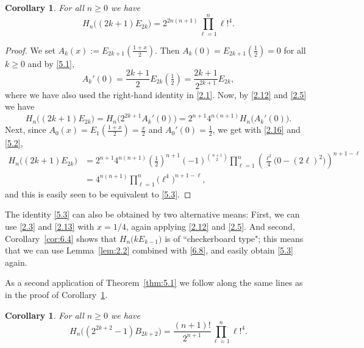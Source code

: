 \documentclass{amsart}
\theoremstyle{plain}
\newtheorem{corollary}[theorem]{Corollary}
\numberwithin{equation}{section}
\begin{document}
\begin{corollary}\label{cor:5.2}
For all $n\geq 0$ we have
\begin{equation}\label{5.3}
H_n\big((2k+1)E_{2k}\big) = 2^{2n(n+1)}\prod_{\ell=1}^n\ell!^4.
\end{equation}
\end{corollary}

\begin{proof}
We set $A_k(x):=E_{2k+1}(\frac{1+x}{2})$. Then $A_k(0)=E_{2k+1}(\frac{1}{2})=0$
for all $k\geq 0$ and by \eqref{5.1}, 
\[
A_k'(0) = \frac{2k+1}{2}E_{2k}(\tfrac{1}{2}) = \frac{2k+1}{2^{2k+1}}E_{2k},
\]
where we have also used the right-hand identity in \eqref{2.1}. 
Now, by \eqref{2.12} and \eqref{2.5} we have
\[
H_n\big((2k+1)E_{2k}\big) = H_n\big(2^{2k+1}A_k'(0)\big) 
= 2^{n+1}4^{n(n+1)}H_n\big(A_k'(0)\big).
\]
Next, since $A_0(x)=E_1(\frac{1+x}{2})=\frac{x}{2}$ and $A_0'(0)=\frac{1}{2}$, 
we get with \eqref{2.16} and \eqref{5.2},
\begin{align*}
H_n\big((2k+1)E_{2k}\big) &= 2^{n+1}4^{n(n+1)}\left(\tfrac{1}{2}\right)^{n+1}
(-1)^{\binom{n+1}{2}}\prod_{\ell=1}^n\left(\frac{\ell^2}{4}\big(0-(2\ell)^2\big)\right)^{n+1-\ell} \\
&= 4^{n(n+1)}\prod_{\ell=1}^n\big(\ell^4\big)^{n+1-\ell},
\end{align*}
and this is easily seen to be equivalent to \eqref{5.3}.
\end{proof}

The identity \eqref{5.3} can also be obtained by two alternative means: First,
we can use \eqref{2.3} and \eqref{2.13} with $x=1/4$, again applying 
\eqref{2.12} and \eqref{2.5}. And second, Corollary~\ref{cor:6.4} shows that
$H_n\big(kE_{k-1}\big)$ is of ``checkerboard type"; this means that we can use 
Lemma~\ref{lem:2.2} combined with \eqref{6.8}, and easily obtain \eqref{5.3}
again.

As a second application of Theorem~\ref{thm:5.1} we follow along the same lines
as in the proof of Corollary~\ref{cor:5.2}.

\begin{corollary}\label{cor:5.3}
For all $n\geq 0$ we have
\begin{equation}\label{5.4}
H_n\big((2^{2k+2}-1)B_{2k+2}\big)=\frac{(n+1)!}{2^{n+1}}\prod_{\ell=1}^n\ell!^4.
\end{equation}
\end{corollary}
\end{document}
